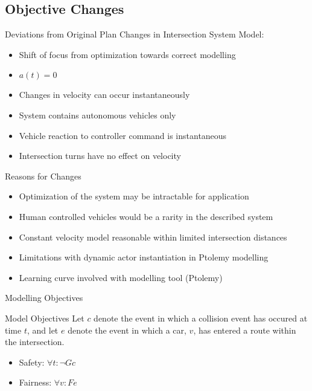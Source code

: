 \documentclass{beamer}
\begin{document}
\subsection{Objective Changes}

\begin{frame}{Deviations from Original Plan}
Changes in Intersection System Model:
\begin{itemize}
\item Shift of focus from optimization towards correct modelling
\item $a(t) = 0$
\item Changes in velocity can occur instantaneously
\item System contains autonomous vehicles only
\item Vehicle reaction to controller command is instantaneous
\item Intersection turns have no effect on velocity
\end{itemize}
\end{frame}

\begin{frame}{Reasons for Changes}
\begin{itemize}
\item Optimization of the system may be intractable for application
\item Human controlled vehicles would be a rarity in the described system
\item Constant velocity model reasonable within limited intersection distances
\item Limitations with dynamic actor instantiation in Ptolemy modelling
\item Learning curve involved with modelling tool (Ptolemy)
\end{itemize}
\end{frame}

\begin{frame}{Modelling Objectives}
\begin{block}{Model Objectives}
Let $c$ denote the event in which a collision event has occured at time $t$, and let $e$ denote the event in which a car, $v$, has entered a route within the intersection.\\
\begin{itemize}
\item Safety:  $\forall t: \neg Gc$
\item Fairness:  $ \forall v: Fe$
\end{itemize}
\end{block}
\end{frame}
\end{document}
